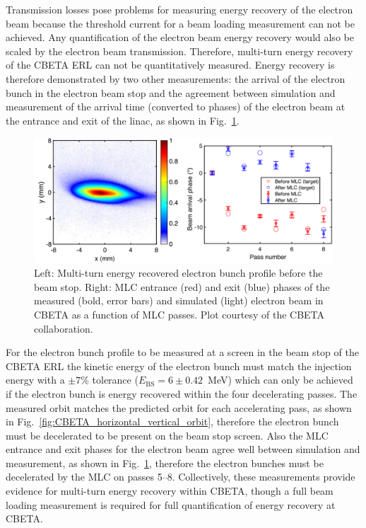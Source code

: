 \documentclass[../main.tex]{subfiles}
\begin{document}
Transmission losses pose problems for measuring energy recovery of the electron beam because the threshold current for a beam loading measurement can not be achieved. Any quantification of the electron beam energy recovery would also be scaled by the electron beam transmission. Therefore, multi-turn energy recovery of the CBETA ERL can not be quantitatively measured. Energy recovery is therefore demonstrated by two other measurements: the arrival of the electron bunch in the electron beam stop and the agreement between simulation and measurement of the arrival time (converted to phases) of the electron beam at the entrance and exit of the linac, as shown in Fig.~\ref{fig:CBETA_phases_dump_bunch}.    
\begin{figure}[!h]
\centering
\includegraphics[width=\textwidth]{Figures/CBETA_Multi-Pass_Commissioning/dump_beam_phases.pdf}
\caption{Left: Multi-turn energy recovered electron bunch profile before the beam stop. Right: MLC entrance (red) and exit (blue) phases of the measured (bold, error bars) and simulated (light) electron beam in CBETA as a function of MLC passes. Plot courtesy of the CBETA collaboration.}
\label{fig:CBETA_phases_dump_bunch}
\end{figure}

For the electron bunch profile to be measured at a screen in the beam stop of the CBETA ERL the kinetic energy of the electron bunch must match the injection energy with a $\pm 7$\% tolerance ($E_{\mathrm{BS}} = 6\pm 0.42$~\si{\mega\electronvolt}) which can only be achieved if the electron bunch is energy recovered within the four decelerating passes. The measured orbit matches the predicted orbit for each accelerating pass, as shown in Fig.~\ref{fig:CBETA_horizontal_vertical_orbit}, therefore the electron bunch must be decelerated to be present on the beam stop screen. Also the MLC entrance and exit phases for the electron beam agree well between simulation and measurement, as shown in Fig.~\ref{fig:CBETA_phases_dump_bunch}, therefore the electron bunches must be decelerated by the MLC on passes 5--8. Collectively, these measurements provide evidence for multi-turn energy recovery within CBETA, though a full beam loading measurement is required for full quantification of energy recovery at CBETA.
\end{document}
